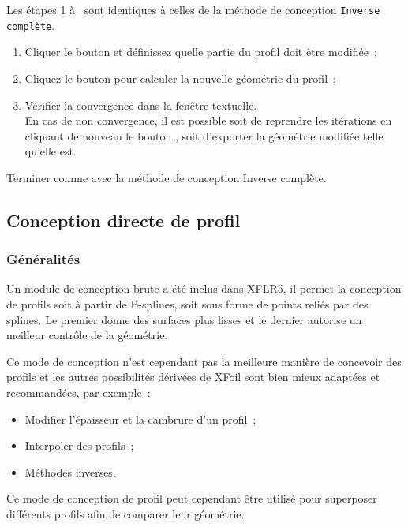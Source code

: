 \documentclass[a4paper,twoside,12pt,dvips]{article}
\begin{document}
Les étapes 1 à \theenumTemp~sont identiques à celles de la méthode de conception \texttt{Inverse complète}.

\begin{enumerate}
	\setcounter{enumi}{\theenumTemp}
	\item Cliquer le bouton  et définissez 
	quelle partie du profil doit être modifiée~;
	\item Cliquez le bouton  pour calculer la nouvelle 
	géométrie du profil~;
	\item Vérifier la convergence dans la fenêtre textuelle.\\
	En cas de non convergence, il est possible soit de reprendre les itérations
	en cliquant de nouveau le bouton , soit d’exporter la 
	géométrie modifiée telle qu’elle est.
\end{enumerate}

Terminer comme avec la méthode de conception Inverse complète.

\subsection{Conception directe de profil}

\subsubsection{Généralités}

Un module de conception brute a été inclus dans XFLR5, il permet la
conception de profils soit à partir de B-splines, soit sous
forme de points reliés par des splines. Le premier donne des surfaces
plus lisses et le dernier autorise un meilleur contrôle de la géométrie.

Ce mode de conception n’est cependant pas la meilleure manière de concevoir
des profils et les autres possibilités dérivées de XFoil sont bien mieux
adaptées et recommandées, par exemple~:

\begin{itemize}
	\item Modifier l’épaisseur et la cambrure d’un profil~;
	\item Interpoler des profils~;
	\item Méthodes inverses.
\end{itemize}

Ce mode de conception de profil peut cependant être utilisé pour superposer
différents profils afin de comparer leur géométrie.
\end{document}

